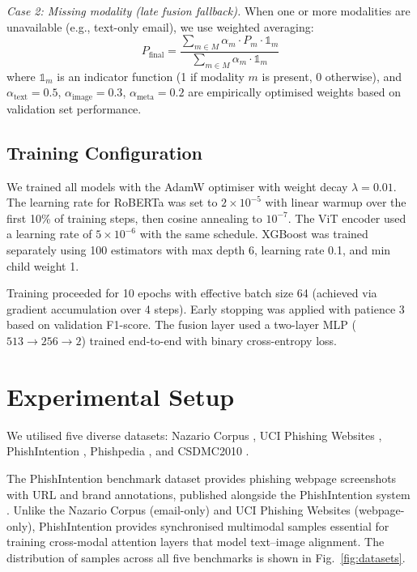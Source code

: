 \documentclass[conference]{IEEEtran}
\begin{document}
\textit{Case 2: Missing modality (late fusion fallback).} When one or more modalities are unavailable (e.g., text-only email), we use weighted averaging:
\begin{equation}
    P_{\text{final}} = \frac{\sum_{m \in M} \alpha_m \cdot P_m \cdot \mathbb{1}_m}{\sum_{m \in M} \alpha_m \cdot \mathbb{1}_m}
\end{equation}
where $\mathbb{1}_m$ is an indicator function (1 if modality $m$ is present, 0 otherwise), and $\alpha_{\text{text}} = 0.5$, $\alpha_{\text{image}} = 0.3$, $\alpha_{\text{meta}} = 0.2$ are empirically optimised weights based on validation set performance.

\subsection{Training Configuration}

We trained all models with the AdamW optimiser with weight decay $\lambda = 0.01$. The learning rate for RoBERTa was set to $2 \times 10^{-5}$ with linear warmup over the first 10\% of training steps, then cosine annealing to $10^{-7}$. The ViT encoder used a learning rate of $5 \times 10^{-6}$ with the same schedule. XGBoost was trained separately using 100 estimators with max depth 6, learning rate 0.1, and min child weight 1.

Training proceeded for 10 epochs with effective batch size 64 (achieved via gradient accumulation over 4 steps). Early stopping was applied with patience 3 based on validation F1-score. The fusion layer used a two-layer MLP ($513 \to 256 \to 2$) trained end-to-end with binary cross-entropy loss.

\section{Experimental Setup}

We utilised five diverse datasets: Nazario Corpus \cite{nazario_2008_phishing_corpus}, UCI Phishing Websites \cite{mohammad_2012_uci_phishing}, PhishIntention \cite{liu_2022_phishintention}, Phishpedia \cite{lin_2021_phishpedia}, and CSDMC2010 \cite{csdmc_2010_spam}.

The PhishIntention benchmark dataset provides phishing webpage screenshots with URL and brand annotations, published alongside the PhishIntention system \cite{liu_2022_phishintention}. Unlike the Nazario Corpus (email-only) and UCI Phishing Websites (webpage-only), PhishIntention provides synchronised multimodal samples essential for training cross-modal attention layers that model text--image alignment. The distribution of samples across all five benchmarks is shown in Fig.~\ref{fig:datasets}.
\end{document}
